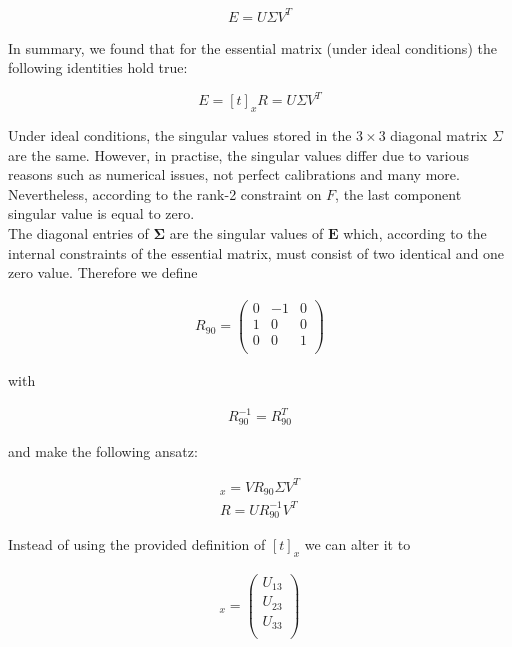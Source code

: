 \documentclass{paper}
\begin{document}
\begin{align}
    E = U \Sigma V^{T}
\end{align}

In summary, we found that for the essential matrix (under ideal conditions) the following identities hold true:

\begin{equation}
    E = [t]_x R = U \Sigma V^{T}
\end{equation}

Under ideal conditions, the singular values stored in the $3 \times 3$ diagonal matrix $\Sigma$ are the same. However, in practise, the singular values differ due to various reasons such as numerical issues, not perfect calibrations and many more. Nevertheless, according to the rank-2 constraint on $F$, the last component singular value is equal to zero. \\

The diagonal entries of $\mathbf{\Sigma}$ are the singular values of $\mathbf{E}$ which, according to the internal constraints of the essential matrix, must consist of two identical and one zero value. Therefore we define 

\begin{align}
    R_{90} = 
    \left(\begin{array}{rrr}
       0  & -1 &  0 \\
       1  &  0 &  0 \\
       0  & 0 &  1 \\
\end{array} \right)
\end{align}

with 

\begin{align}
    R_{90}^{-1} = R_{90}^{T}
\end{align}




and make the following ansatz:

\begin{align}
    [t]_x = V R_{90} \Sigma V^{T} \\
    R = U R_{90}^{-1} V^{T}
\label{eq:ansatz}
\end{align}

Instead of using the provided definition of $[t]_x$ we can alter it to

\begin{align}
    [t]_x  = 
    \left(\begin{array}{r}
       U_{13} \\
       U_{23} \\  
       U_{33} \\
\end{array} \right)
\end{align}
\end{document}

